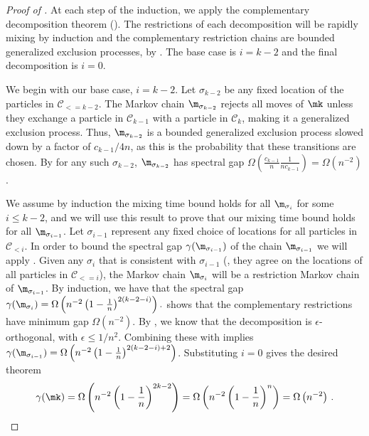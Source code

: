 %
\begin{proof}[Proof of ]
At each step of the induction, we apply the complementary decomposition 
theorem (). The restrictions of each 
decomposition will be rapidly mixing by induction and the complementary 
restriction chains are bounded generalized exclusion processes, by 
.  The base case is $i=k-2$ and the final 
decomposition is $i=0$.
 
We begin with our base case, $i=k-2$.  
Let $\sigma_{k-2}$ be any fixed location of the particles in $\mathcal{C}_{<= k-2}.$ 
The Markov chain $\m_{\sigma_{k-2}}$ rejects all moves of $\mk$ unless 
they exchange a particle in $\mathcal{C}_{k-1}$ with a particle in 
$\mathcal{C}_{k}$,
making it a generalized exclusion process. Thus, 
$\m_{\sigma_{k-2}}$ is a bounded generalized exclusion process slowed 
down by a factor of $c_{k-1}/4n$, as this is the probability that 
these transitions are chosen.  By  for any 
such $\sigma_{k-2}$, $\m_{\sigma_{k-2}}$ has spectral gap 
$\Omega(\frac{c_{k-1}}{n}\frac{1}{n c_{k-1}})=\Omega(n^{-2})$. 

We assume by induction the mixing time bound holds for all 
$\m_{\sigma_i}$ for some $i\leq k-2$, and we will use this result to 
prove that our mixing time bound holds for all $\m_{\sigma_{i-1}}$. Let 
$\sigma_{i-1}$ represent any fixed choice of locations for all 
particles in $\mathcal{C}_{< i}$.  In order to bound the spectral gap 
$\gamma( \m_{\sigma_{i-1}})$ of the chain $\m_{\sigma_{i-1}}$ we will 
apply .  Given any $\sigma_i$ that is 
consistent with $\sigma_{i-1}$ (\ie,  they agree on the locations of all 
particles in $\mathcal{C}_{<= i}$), the Markov chain $\m_{\sigma_i}$ 
will be a restriction Markov chain of $\m_{\sigma_{i-1}}$.  By 
induction, we have that the spectral gap $\gamma(\m_{\sigma_i})= 
\Omega\left(n^{-2}\left(1-\frac{1}{n}\right)^{2(k-2-i)}\right).$ 
 shows that the complementary restrictions have 
minimum gap $\Omega(n^{-2}).$ By , we know that 
the decomposition is %
$\epsilon$-orthogonal, with $\epsilon\leq 1/n^2$. %
Combining these with 
 implies $\gamma(\m_{\sigma_{i-1}})= 
\Omega\left(n^{-2}\left(1-\frac{1}{n}\right)^{2(k-2-i)+2}\right)$. 
Substituting $i = 0$ gives the desired theorem
%
\[
\gamma(\mk) = 
\Omega\left(n^{-2}\left(1-\frac{1}{n}\right)^{2k-2}\right) = 
\Omega\left(n^{-2}\left(1-\frac{1}{n}\right)^{n}\right) = 
\Omega\left(n^{-2}\right)\,.\qedhere
%
\]
\end{proof}
%

